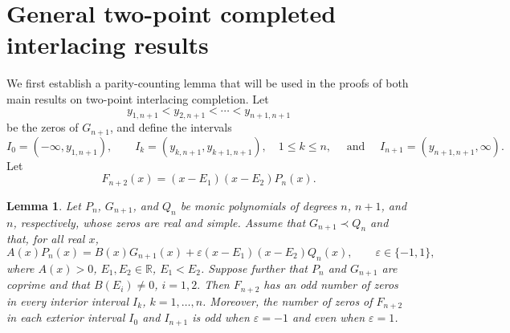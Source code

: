\documentclass[final,3p,times,12pt]{elsarticle}
\newtheorem{lemma}{Lemma}[section]
\numberwithin{equation}{section}  %
\begin{document}
\section{General two-point completed interlacing results} \label{General interlacing Results}

We first establish a parity-counting lemma that will be used in the proofs of both main results on two-point interlacing completion. Let \[ y_{1,n+1}<y_{2,n+1}<\cdots<y_{n+1,n+1} \] be the zeros of $G_{n+1}$, and define the intervals 
\[ I_0=(-\infty,y_{1,n+1}),\qquad I_k=(y_{k,n+1},y_{k+1,n+1}),\quad 1\leq k\leq n, \quad\text{ and }\quad I_{n+1}=(y_{n+1,n+1},\infty). \] Let \[ F_{n+2}(x)=(x-E_1)(x-E_2)P_n(x). \] 

\begin{lemma}\label{lem:parity-counting} Let $P_n$, $G_{n+1}$, and $Q_n$ be monic polynomials of degrees $n$, $n+1$, and $n$, respectively, whose zeros are real and simple. Assume that $G_{n+1}\prec Q_n$ and that, for all real $x$, \begin{equation} A(x)P_n(x) = B(x)G_{n+1}(x) + \varepsilon (x-E_1)(x-E_2)Q_n(x), \qquad \varepsilon\in\{-1,1\}, \label{eq:general-signed-recurrence} \end{equation} where $A(x)>0$, $E_1,E_2\in \mathbb{R}$, $E_1<E_2$. Suppose further that $P_n$ and $G_{n+1}$ are coprime and that $B(E_i)\neq 0$, $i=1,2.$ Then $F_{n+2}$ has an odd number of zeros in every interior interval $I_k$, $k=1,\dots,n$. Moreover, the number of zeros of $F_{n+2}$ in each exterior interval $I_0$ and $I_{n+1}$ is odd when $\varepsilon=-1$ and even when $\varepsilon =1$.\end{lemma} 
\end{document}
